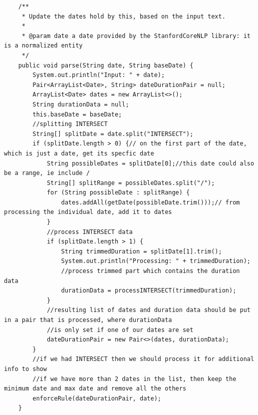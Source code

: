 \begin{lstlisting}
    /**
     * Update the dates hold by this, based on the input text.
     *
     * @param date a date provided by the StanfordCoreNLP library: it is a normalized entity
     */
    public void parse(String date, String baseDate) {
        System.out.println("Input: " + date);
        Pair<ArrayList<Date>, String> dateDurationPair = null;
        ArrayList<Date> dates = new ArrayList<>();
        String durationData = null;
        this.baseDate = baseDate;
        //splitting INTERSECT
        String[] splitDate = date.split("INTERSECT");
        if (splitDate.length > 0) {// on the first part of the date, which is just a date, get its specfic date
            String possibleDates = splitDate[0];//this date could also be a range, ie include /
            String[] splitRange = possibleDates.split("/");
            for (String possibleDate : splitRange) {
                dates.addAll(getDate(possibleDate.trim()));// from processing the individual date, add it to dates
            }
            //process INTERSECT data
            if (splitDate.length > 1) {
                String trimmedDuration = splitDate[1].trim();
                System.out.println("Processing: " + trimmedDuration);
                //process trimmed part which contains the duration data
                durationData = processINTERSECT(trimmedDuration);
            }
            //resulting list of dates and duration data should be put in a pair that is processed, where durationData
            //is only set if one of our dates are set
            dateDurationPair = new Pair<>(dates, durationData);
        }
        //if we had INTERSECT then we should process it for additional info to show
        //if we have more than 2 dates in the list, then keep the minimum date and max date and remove all the others
        enforceRule(dateDurationPair, date);
    }


\end{lstlisting}
